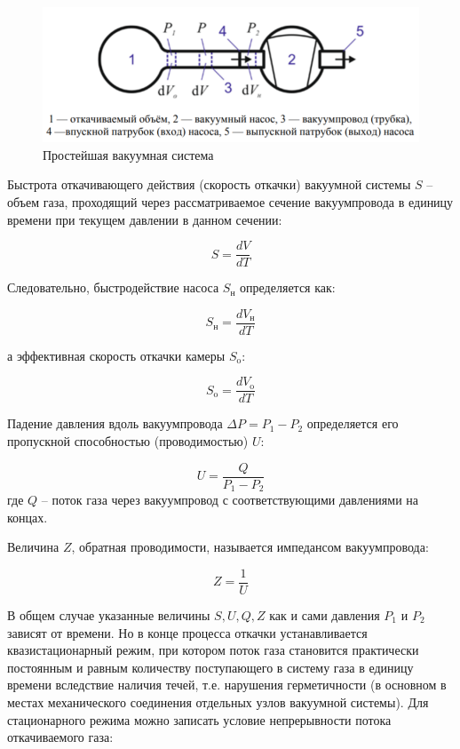 \documentclass[a4paper,12pt]{article}
\begin{document}
\begin{figure}[h]
    \centering
    \includegraphics[width = 11 cm]{1png.png}
    \caption{Простейшая вакуумная система}
    \label{fig:vac}
\end{figure}

Быстрота откачивающего действия (скорость откачки) вакуумной системы $S$ -- объем газа, проходящий через рассматриваемое сечение вакуумпровода в единицу времени при текущем давлении
в данном сечении:
 
\begin{equation}
	S = \frac{dV}{dT}
\end{equation}

Следовательно, быстродействие насоса $S_{\text{н}}$ определяется как:

\begin{equation}
	S_{\text{н}} = \frac{dV_{\text{н}}}{dT}
\end{equation}

а эффективная скорость откачки камеры $S_{\text{o}}$:

\begin{equation}
	S_{\text{o}} = \frac{dV_{\text{o}}}{dT}
\end{equation}

Падение давления вдоль вакуумпровода $\Delta P = P_1 - P_2$ определяется его пропускной способностью (проводимостью) $U$:

\begin{equation}
	U = \frac{Q}{P_1 - P_2}
\end{equation}
где $Q$ -- поток газа через вакуумпровод с соответствующими
давлениями на концах.

Величина $Z$, обратная проводимости, называется импедансом вакуумпровода:

\begin{equation}
	Z = \frac{1}{U}
\end{equation}

В общем случае указанные величины $S, U, Q, Z$ как и сами давления $P_1$ и $P_2$ зависят от времени. Но в конце процесса откачки устанавливается квазистационарный режим, при котором поток газа становится практически постоянным и равным количеству поступающего в систему газа
в единицу времени вследствие наличия течей, т.е. нарушения герметичности (в основном в местах механического соединения отдельных узлов
вакуумной системы). Для стационарного режима можно записать условие
непрерывности потока откачиваемого газа:
\end{document}

